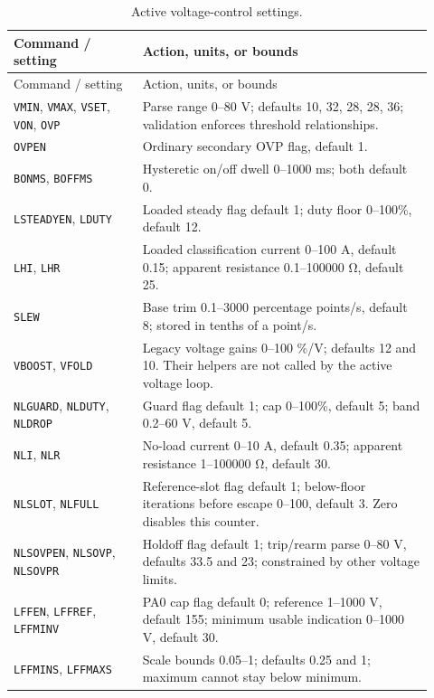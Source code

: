 \begin{longtable}{@{}L{0.29\linewidth}L{0.63\linewidth}@{}}
\caption{Active voltage-control settings.}\label{tab:app-fw-control-settings}\\
\toprule Command / setting & Action, units, or bounds\\\midrule
\endfirsthead
\toprule Command / setting & Action, units, or bounds\\\midrule
\endhead
\texttt{VMIN}, \texttt{VMAX}, \texttt{VSET}, \texttt{VON}, \texttt{OVP} & Parse range 0--80 V; defaults 10, 32, 28, 28, 36; validation enforces threshold relationships.\\
\texttt{OVPEN} & Ordinary secondary OVP flag, default 1.\\
\texttt{BONMS}, \texttt{BOFFMS} & Hysteretic on/off dwell 0--1000 ms; both default 0.\\
\texttt{LSTEADYEN}, \texttt{LDUTY} & Loaded steady flag default 1; duty floor 0--100\%, default 12.\\
\texttt{LHI}, \texttt{LHR} & Loaded classification current 0--100 A, default 0.15; apparent resistance 0.1--100000 \si{\ohm}, default 25.\\
\texttt{SLEW} & Base trim 0.1--3000 percentage points/s, default 8; stored in tenths of a point/s.\\
\texttt{VBOOST}, \texttt{VFOLD} & Legacy voltage gains 0--100 \%/V; defaults 12 and 10. Their helpers are not called by the active voltage loop.\\
\texttt{NLGUARD}, \texttt{NLDUTY}, \texttt{NLDROP} & Guard flag default 1; cap 0--100\%, default 5; band 0.2--60 V, default 5.\\
\texttt{NLI}, \texttt{NLR} & No-load current 0--10 A, default 0.35; apparent resistance 1--100000 \si{\ohm}, default 30.\\
\texttt{NLSLOT}, \texttt{NLFULL} & Reference-slot flag default 1; below-floor iterations before escape 0--100, default 3. Zero disables this counter.\\
\texttt{NLSOVPEN}, \texttt{NLSOVP}, \texttt{NLSOVPR} & Holdoff flag default 1; trip/rearm parse 0--80 V, defaults 33.5 and 23; constrained by other voltage limits.\\
\texttt{LFFEN}, \texttt{LFFREF}, \texttt{LFFMINV} & PA0 cap flag default 0; reference 1--1000 V, default 155; minimum usable indication 0--1000 V, default 30.\\
\texttt{LFFMINS}, \texttt{LFFMAXS} & Scale bounds 0.05--1; defaults 0.25 and 1; maximum cannot stay below minimum.\\
\bottomrule
\end{longtable}
